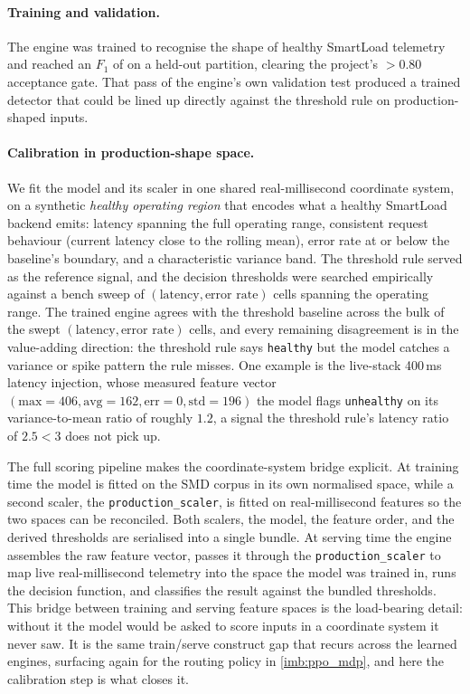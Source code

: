 \paragraph{Training and validation.} The engine was trained to recognise the
shape of healthy SmartLoad telemetry and reached an $F_1$ of \BMifFone{} on a
held-out partition, clearing the project's $>0.80$ acceptance gate. That pass of
the engine's own validation test produced a trained detector that could be lined
up directly against the threshold rule on production-shaped inputs.

\paragraph{Calibration in production-shape space.} We fit the model and its scaler
in one shared real-millisecond coordinate system, on a synthetic \emph{healthy
operating region} that encodes what a healthy SmartLoad backend emits: latency
spanning the full operating range, consistent request behaviour (current latency
close to the rolling mean), error rate at or below the baseline's boundary, and a
characteristic variance band. The threshold rule served as the reference signal,
and the decision thresholds were searched empirically against a bench sweep of
$(\text{latency}, \text{error rate})$ cells spanning the operating range. The
trained engine agrees with the threshold baseline across the bulk of the swept
$(\text{latency}, \text{error rate})$ cells, and every remaining disagreement is in
the value-adding direction: the threshold rule says \texttt{healthy} but the model
catches a variance or spike pattern the rule misses. One example is the live-stack
400\,ms latency injection, whose measured feature vector $(\text{max}=406,
\text{avg}=162, \text{err}=0, \text{std}=196)$ the model flags \texttt{unhealthy}
on its variance-to-mean ratio of roughly $1.2$, a signal the threshold rule's
latency ratio of $2.5 < 3$ does not pick up.

The full scoring pipeline makes the coordinate-system bridge explicit. At training
time the model is fitted on the SMD corpus in its own normalised space, while a
second scaler, the \texttt{production\_scaler}, is fitted on real-millisecond
features so the two spaces can be reconciled. Both scalers, the model, the feature
order, and the derived thresholds are serialised into a single bundle. At serving
time the engine assembles the raw feature vector, passes it through the
\texttt{production\_scaler} to map live real-millisecond telemetry into the space
the model was trained in, runs the decision function, and classifies the result
against the bundled thresholds. This bridge between training and serving feature
spaces is the load-bearing detail: without it the model would be asked to score
inputs in a coordinate system it never saw. It is the same train/serve construct
gap that recurs across the learned engines, surfacing again for the routing policy
in \cref{imb:ppo_mdp}, and here the calibration step is what closes it.

